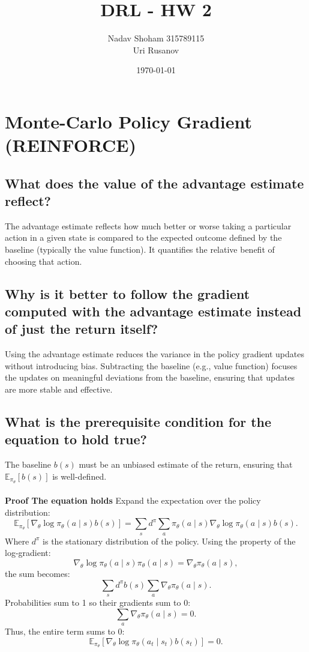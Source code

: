 \documentclass[a4paper]{article}
\title{DRL - HW 2}
\author{Nadav Shoham 315789115 \\ Uri Rusanov}
\date{\today}
\begin{document}
\maketitle

\section{Monte-Carlo Policy Gradient (REINFORCE)}\label{sec:monte-carlo-policy-gradient-(reinforce)}

\subsection{What does the value of the advantage estimate reflect?}\label{subsec:what-does-the-value-of-the-advantage-estimate-reflect?}
The advantage estimate reflects how much better or worse taking a particular action in a given state is compared to the expected outcome defined by the baseline (typically the value function).
It quantifies the relative benefit of choosing that action.

\subsection{Why is it better to follow the gradient computed with the advantage estimate instead of just the return itself?}\label{subsec:why-is-it-better-to-follow-the-gradient-computed-with-the-advantage-estimate-instead-of-just-the-return-itself?}
Using the advantage estimate reduces the variance in the policy gradient updates without introducing bias.
Subtracting the baseline (e.g., value function) focuses the updates on meaningful deviations from the baseline, ensuring that updates are more stable and effective.

\subsection{What is the prerequisite condition for the equation to hold true?}\label{subsec:what-is-the-prerequisite-condition-for-the-equation-to-hold-true?-prove-the-equation.}
The baseline \( b(s) \) must be an unbiased estimate of the return, ensuring that \( \mathbb{E}_{\pi_\theta}[b(s)] \) is well-defined.
\\
\\
\textbf{Proof The equation holds}
Expand the expectation over the policy distribution:
\[
\mathbb{E}_{\pi_\theta} \left[ \nabla_\theta \log \pi_\theta(a \mid s) b(s) \right] = \sum_s d^\pi \sum_a \pi_\theta(a \mid s) \nabla_\theta \log \pi_\theta(a \mid s) b(s).
\]
Where \( d^\pi \) is the stationary distribution of the policy.
Using the property of the log-gradient:
\[
\nabla_\theta \log \pi_\theta(a \mid s) \pi_\theta(a \mid s) = \nabla_\theta \pi_\theta(a \mid s),
\]
the sum becomes:
\[
\sum_s d^\pi b(s) \sum_a \nabla_\theta \pi_\theta(a \mid s).
\]
Probabilities sum to 1 so their gradients sum to 0:
\[
\sum_a \nabla_\theta \pi_\theta(a \mid s) = 0.
\]
Thus, the entire term sums to 0:
\[
\mathbb{E}_{\pi_\theta} \left[ \nabla_\theta \log \pi_\theta(a_t \mid s_t) b(s_t) \right] = 0.
\]
\end{document}
